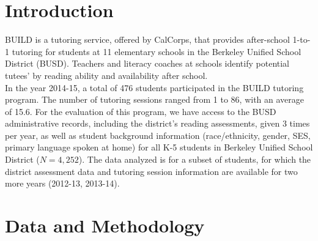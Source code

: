 \documentclass[a0,landscape]{a0poster}
\begin{document}
\vspace{0.5cm} %



\begin{multicols}{3} %



\color{SaddleBrown} %

\section*{Introduction}

BUILD is a tutoring service, offered by CalCorps, that provides after-school 1-to-1 tutoring for students at 11 elementary schools in the Berkeley Unified School District (BUSD). Teachers and literacy coaches at schools identify potential tutees' by reading ability and availability after school. \\

In the year 2014-15, a total of 476 students participated in the BUILD tutoring program. The number of tutoring sessions ranged from 1 to 86, with an average of 15.6. For the evaluation of this program, we have access to the BUSD administrative records, including the district's reading assessments, given 3 times per year, as well as student background information (race/ethnicity, gender, SES, primary language spoken at home) for all K-5 students in Berkeley Unified School District ($N = 4,252$). The data analyzed is for a subset of students, for which the district assessment data and tutoring session information are available for two more years (2012-13, 2013-14).


\color{NavyBlue}
\section*{Data and Methodology}


\end{multicols}
\end{document}
